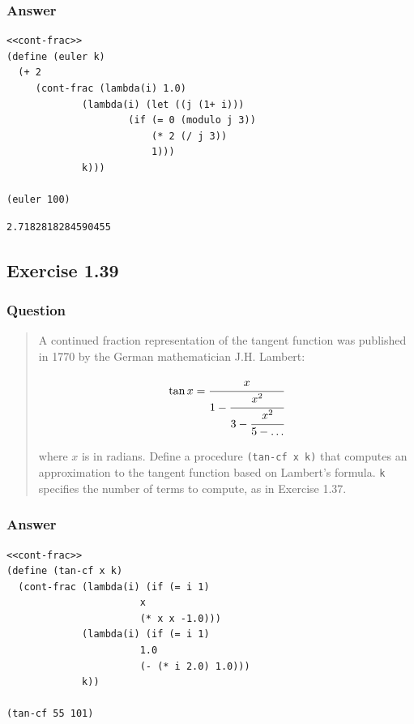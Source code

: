 \documentclass[final,fleqn,titlepage,twoside]{article}
\begin{document}
\subsubsection{Answer}
\label{sec:org859e7b0}
\begin{verbatim}
<<cont-frac>>
(define (euler k)
  (+ 2
     (cont-frac (lambda(i) 1.0)
             (lambda(i) (let ((j (1+ i)))
                     (if (= 0 (modulo j 3))
                         (* 2 (/ j 3))
                         1)))
             k)))

(euler 100)
\end{verbatim}

\begin{verbatim}
2.7182818284590455
\end{verbatim}

\subsection{Exercise 1.39}
\label{sec:org7d94c6d}
\subsubsection{Question}
\label{sec:org1c2b5c4}
\begin{quote}
A continued fraction representation of the tangent function was published in
1770 by the German mathematician J.H. Lambert:

\[ {\tan x} = \cfrac{x}{1 - \cfrac{x^2}{3 - \cfrac{x^2}{5 - \dots}}} \]

where \(x\) is in radians. Define a procedure \texttt{(tan-cf x k)} that
computes an approximation to the tangent function based on Lambert's formula.
\texttt{k} specifies the number of terms to compute, as in Exercise 1.37.
\end{quote}

\subsubsection{Answer}
\label{sec:org4fcc188}
\begin{verbatim}
<<cont-frac>>
(define (tan-cf x k)
  (cont-frac (lambda(i) (if (= i 1)
                       x
                       (* x x -1.0)))
             (lambda(i) (if (= i 1)
                       1.0
                       (- (* i 2.0) 1.0)))
             k))

(tan-cf 55 101)
\end{verbatim}
\end{document}
